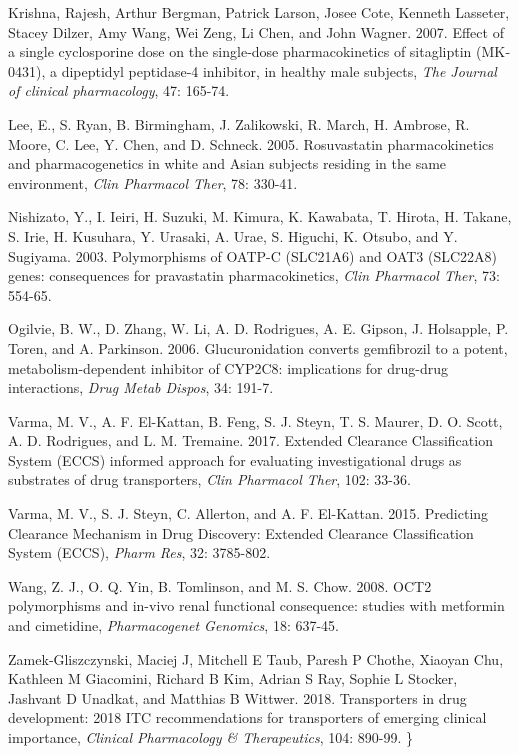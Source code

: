 \documentclass[
  11pt,
  krantz2, a4paper, twoside]{krantz}
\begin{document}
Krishna, Rajesh, Arthur Bergman, Patrick Larson, Josee Cote, Kenneth
Lasseter, Stacey Dilzer, Amy Wang, Wei Zeng, Li Chen, and John Wagner.
2007. \textquotesingle Effect of a single cyclosporine dose on the single‐dose
pharmacokinetics of sitagliptin (MK‐0431), a dipeptidyl peptidase‐4
inhibitor, in healthy male subjects\textquotesingle, \emph{The Journal of clinical
pharmacology}, 47: 165-74.

Lee, E., S. Ryan, B. Birmingham, J. Zalikowski, R. March, H. Ambrose, R.
Moore, C. Lee, Y. Chen, and D. Schneck. 2005. \textquotesingle Rosuvastatin
pharmacokinetics and pharmacogenetics in white and Asian subjects
residing in the same environment\textquotesingle, \emph{Clin Pharmacol Ther}, 78: 330-41.

Nishizato, Y., I. Ieiri, H. Suzuki, M. Kimura, K. Kawabata, T. Hirota,
H. Takane, S. Irie, H. Kusuhara, Y. Urasaki, A. Urae, S. Higuchi, K.
Otsubo, and Y. Sugiyama. 2003. \textquotesingle Polymorphisms of OATP-C (SLC21A6) and
OAT3 (SLC22A8) genes: consequences for pravastatin pharmacokinetics\textquotesingle,
\emph{Clin Pharmacol Ther}, 73: 554-65.

Ogilvie, B. W., D. Zhang, W. Li, A. D. Rodrigues, A. E. Gipson, J.
Holsapple, P. Toren, and A. Parkinson. 2006. \textquotesingle Glucuronidation converts
gemfibrozil to a potent, metabolism-dependent inhibitor of CYP2C8:
implications for drug-drug interactions\textquotesingle, \emph{Drug Metab Dispos}, 34:
191-7.

Varma, M. V., A. F. El-Kattan, B. Feng, S. J. Steyn, T. S. Maurer, D. O.
Scott, A. D. Rodrigues, and L. M. Tremaine. 2017. \textquotesingle Extended Clearance
Classification System (ECCS) informed approach for evaluating
investigational drugs as substrates of drug transporters\textquotesingle, \emph{Clin
Pharmacol Ther}, 102: 33-36.

Varma, M. V., S. J. Steyn, C. Allerton, and A. F. El-Kattan. 2015.
\textquotesingle Predicting Clearance Mechanism in Drug Discovery: Extended Clearance
Classification System (ECCS)\textquotesingle, \emph{Pharm Res}, 32: 3785-802.

Wang, Z. J., O. Q. Yin, B. Tomlinson, and M. S. Chow. 2008. \textquotesingle OCT2
polymorphisms and in-vivo renal functional consequence: studies with
metformin and cimetidine\textquotesingle, \emph{Pharmacogenet Genomics}, 18: 637-45.

Zamek‐Gliszczynski, Maciej J, Mitchell E Taub, Paresh P Chothe, Xiaoyan
Chu, Kathleen M Giacomini, Richard B Kim, Adrian S Ray, Sophie L
Stocker, Jashvant D Unadkat, and Matthias B Wittwer. 2018.
\textquotesingle Transporters in drug development: 2018 ITC recommendations for
transporters of emerging clinical importance\textquotesingle, \emph{Clinical Pharmacology \&
Therapeutics}, 104: 890-99.
\}
\end{document}
